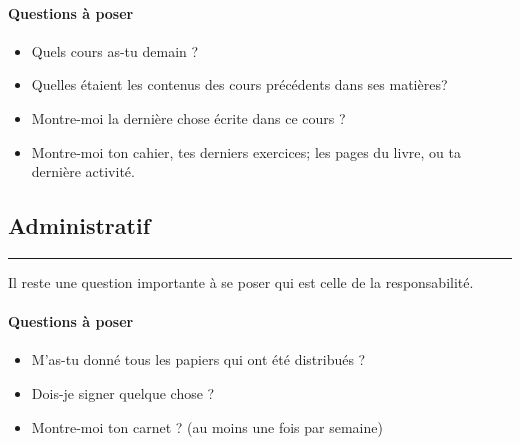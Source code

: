 \documentclass[11pt]{article}
\newcommand{\horrule}[1]{\rule{\linewidth}{#1}} %
\begin{document}
\begin{multicols}{2}
\paragraph{Questions à poser}

\begin{itemize}
  \item Quels cours as-tu demain ?
  \item Quelles étaient les contenus des cours précédents dans ses matières?
  \item Montre-moi la dernière chose écrite dans ce cours ? 
  \item Montre-moi ton cahier, tes derniers exercices; les pages du livre, ou ta dernière activité. 
 \end{itemize} 
\end{multicols}

\subsection*{Administratif}
\horrule{1px}

Il reste une question importante à se poser qui est celle de la responsabilité.
\begin{multicols}{2}
\paragraph{Questions à poser}

\begin{itemize}
  \item M'as-tu donné tous les papiers qui ont été distribués ?
  \item Dois-je signer quelque chose ?
  \item Montre-moi ton carnet ? (au moins une fois par semaine)
\end{itemize} 
\end{multicols}
\end{document}
